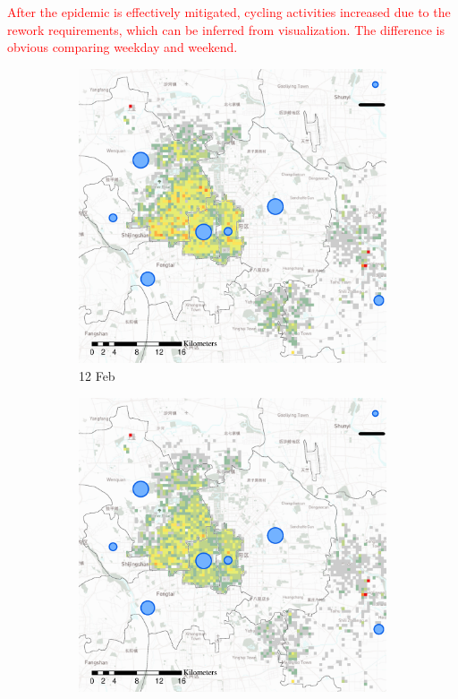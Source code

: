 \documentclass[preprints,ijgi,submit,moreauthors]{Definitions/mdpi}
\begin{document}
\textcolor{red}{After the epidemic is effectively mitigated, cycling activities increased due to the rework requirements, which can be inferred from visualization. The difference is obvious comparing weekday and weekend.}

\begin{figure}[ht]
    \centering
    \begin{subfigure}{.3\textwidth}
        \includegraphics[width=\textwidth]{Figures/Relation_with_confrimed_cases/NewDistrictSSBD2020_02_12.eps}
        \caption{12 Feb}
    \end{subfigure}
    \begin{subfigure}{.3\textwidth}
        \includegraphics[width=\textwidth]{Figures/Relation_with_confrimed_cases/NewDistrictSSBD2020_02_16.eps}

\end{subfigure}
\end{figure}
\end{document}
